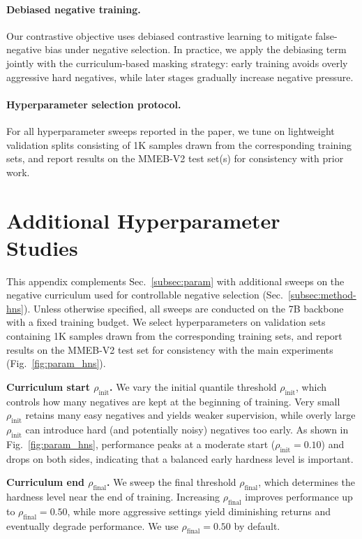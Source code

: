 \paragraph{Debiased negative training.}
Our contrastive objective uses debiased contrastive learning to mitigate false-negative bias under negative selection.
In practice, we apply the debiasing term jointly with the curriculum-based masking strategy: early training avoids overly aggressive hard negatives, while later stages gradually increase negative pressure.

\paragraph{Hyperparameter selection protocol.}
For all hyperparameter sweeps reported in the paper, we tune on lightweight validation splits consisting of 1K samples drawn from the corresponding training sets, and report results on the MMEB-V2 test set(s) for consistency with prior work.




\section{Additional Hyperparameter Studies}
\label{app:param}

This appendix complements Sec.~\ref{subsec:param} with additional sweeps on the negative curriculum used for controllable negative selection (Sec.~\ref{subsec:method-hns}).
Unless otherwise specified, all sweeps are conducted on the 7B backbone with a fixed training budget.
We select hyperparameters on validation sets containing 1K samples drawn from the corresponding training sets, and report results on the MMEB-V2 test set for consistency with the main experiments (Fig.~\ref{fig:param_hns}).

\noindent\textbf{Curriculum start $\rho_{\mathrm{init}}$.}
We vary the initial quantile threshold $\rho_{\mathrm{init}}$, which controls how many negatives are kept at the beginning of training.
Very small $\rho_{\mathrm{init}}$ retains many easy negatives and yields weaker supervision, while overly large $\rho_{\mathrm{init}}$ can introduce hard (and potentially noisy) negatives too early.
As shown in Fig.~\ref{fig:param_hns}, performance peaks at a moderate start ($\rho_{\mathrm{init}}=0.10$) and drops on both sides, indicating that a balanced early hardness level is important.

\noindent\textbf{Curriculum end $\rho_{\mathrm{final}}$.}
We sweep the final threshold $\rho_{\mathrm{final}}$, which determines the hardness level near the end of training.
Increasing $\rho_{\mathrm{final}}$ improves performance up to $\rho_{\mathrm{final}}=0.50$, while more aggressive settings yield diminishing returns and eventually degrade performance.
We use $\rho_{\mathrm{final}}=0.50$ by default.


